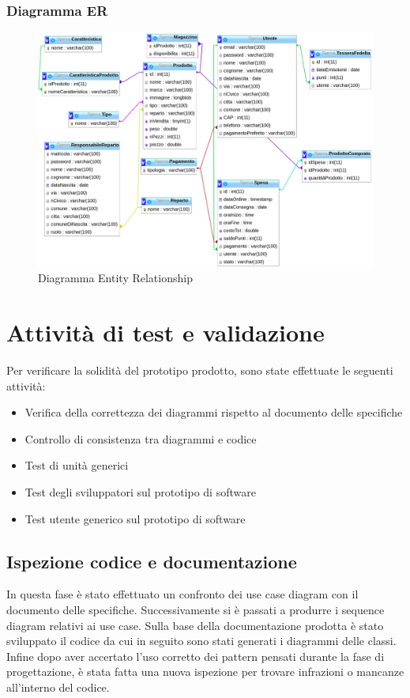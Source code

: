 \documentclass{article}
\begin{document}
\subsubsection{Diagramma ER}
\begin{figure}[h!]
	\centering
	\includegraphics[width=\textwidth]{DiagrammaER.png}
	\caption{Diagramma Entity Relationship}
	\label{fig:DiagrammaER}
\end{figure}
\newpage

\section{Attività di test e validazione}
Per verificare la solidità del prototipo prodotto, sono state effettuate le seguenti attività:
\begin{itemize}
	\item{Verifica della correttezza dei diagrammi rispetto al documento delle specifiche}
	\item{Controllo di consistenza tra diagrammi e codice}
	\item{Test di unità generici }
	\item{Test degli sviluppatori sul prototipo di software }
	\item{Test utente generico sul prototipo di software}
\end{itemize}
\subsection{Ispezione codice e documentazione}
\noindent
In questa fase è stato effettuato un confronto dei use case diagram con  il documento delle specifiche. Successivamente si è passati a produrre i sequence diagram relativi ai use case.
Sulla base della documentazione prodotta è stato sviluppato il codice da cui in seguito sono stati generati i diagrammi delle classi. Infine dopo aver accertato l'uso corretto dei pattern pensati durante la fase di progettazione, è stata fatta una nuova ispezione per trovare infrazioni o mancanze all'interno del codice.
\end{document}
